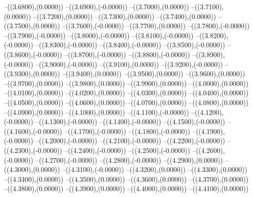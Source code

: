 {	--({\sx*(3.6800)},{\sy*(0.0000)})
	--({\sx*(3.6900)},{\sy*(-0.0000)})
	--({\sx*(3.7000)},{\sy*(0.0000)})
	--({\sx*(3.7100)},{\sy*(0.0000)})
	--({\sx*(3.7200)},{\sy*(0.0000)})
	--({\sx*(3.7300)},{\sy*(0.0000)})
	--({\sx*(3.7400)},{\sy*(0.0000)})
	--({\sx*(3.7500)},{\sy*(0.0000)})
	--({\sx*(3.7600)},{\sy*(-0.0000)})
	--({\sx*(3.7700)},{\sy*(0.0000)})
	--({\sx*(3.7800)},{\sy*(-0.0000)})
	--({\sx*(3.7900)},{\sy*(-0.0000)})
	--({\sx*(3.8000)},{\sy*(-0.0000)})
	--({\sx*(3.8100)},{\sy*(-0.0000)})
	--({\sx*(3.8200)},{\sy*(-0.0000)})
	--({\sx*(3.8300)},{\sy*(-0.0000)})
	--({\sx*(3.8400)},{\sy*(-0.0000)})
	--({\sx*(3.8500)},{\sy*(-0.0000)})
	--({\sx*(3.8600)},{\sy*(-0.0000)})
	--({\sx*(3.8700)},{\sy*(-0.0000)})
	--({\sx*(3.8800)},{\sy*(-0.0000)})
	--({\sx*(3.8900)},{\sy*(-0.0000)})
	--({\sx*(3.9000)},{\sy*(-0.0000)})
	--({\sx*(3.9100)},{\sy*(0.0000)})
	--({\sx*(3.9200)},{\sy*(-0.0000)})
	--({\sx*(3.9300)},{\sy*(0.0000)})
	--({\sx*(3.9400)},{\sy*(0.0000)})
	--({\sx*(3.9500)},{\sy*(0.0000)})
	--({\sx*(3.9600)},{\sy*(0.0000)})
	--({\sx*(3.9700)},{\sy*(0.0000)})
	--({\sx*(3.9800)},{\sy*(0.0000)})
	--({\sx*(3.9900)},{\sy*(0.0000)})
	--({\sx*(4.0000)},{\sy*(0.0000)})
	--({\sx*(4.0100)},{\sy*(0.0000)})
	--({\sx*(4.0200)},{\sy*(0.0000)})
	--({\sx*(4.0300)},{\sy*(0.0000)})
	--({\sx*(4.0400)},{\sy*(0.0000)})
	--({\sx*(4.0500)},{\sy*(0.0000)})
	--({\sx*(4.0600)},{\sy*(0.0000)})
	--({\sx*(4.0700)},{\sy*(0.0000)})
	--({\sx*(4.0800)},{\sy*(0.0000)})
	--({\sx*(4.0900)},{\sy*(0.0000)})
	--({\sx*(4.1000)},{\sy*(0.0000)})
	--({\sx*(4.1100)},{\sy*(-0.0000)})
	--({\sx*(4.1200)},{\sy*(-0.0000)})
	--({\sx*(4.1300)},{\sy*(-0.0000)})
	--({\sx*(4.1400)},{\sy*(-0.0000)})
	--({\sx*(4.1500)},{\sy*(-0.0000)})
	--({\sx*(4.1600)},{\sy*(-0.0000)})
	--({\sx*(4.1700)},{\sy*(-0.0000)})
	--({\sx*(4.1800)},{\sy*(-0.0000)})
	--({\sx*(4.1900)},{\sy*(-0.0000)})
	--({\sx*(4.2000)},{\sy*(-0.0000)})
	--({\sx*(4.2100)},{\sy*(-0.0000)})
	--({\sx*(4.2200)},{\sy*(-0.0000)})
	--({\sx*(4.2300)},{\sy*(-0.0000)})
	--({\sx*(4.2400)},{\sy*(-0.0000)})
	--({\sx*(4.2500)},{\sy*(-0.0000)})
	--({\sx*(4.2600)},{\sy*(-0.0000)})
	--({\sx*(4.2700)},{\sy*(-0.0000)})
	--({\sx*(4.2800)},{\sy*(-0.0000)})
	--({\sx*(4.2900)},{\sy*(0.0000)})
	--({\sx*(4.3000)},{\sy*(0.0000)})
	--({\sx*(4.3100)},{\sy*(-0.0000)})
	--({\sx*(4.3200)},{\sy*(0.0000)})
	--({\sx*(4.3300)},{\sy*(0.0000)})
	--({\sx*(4.3400)},{\sy*(0.0000)})
	--({\sx*(4.3500)},{\sy*(0.0000)})
	--({\sx*(4.3600)},{\sy*(0.0000)})
	--({\sx*(4.3700)},{\sy*(0.0000)})
	--({\sx*(4.3800)},{\sy*(0.0000)})
	--({\sx*(4.3900)},{\sy*(0.0000)})
	--({\sx*(4.4000)},{\sy*(0.0000)})
	--({\sx*(4.4100)},{\sy*(0.0000)})
}
